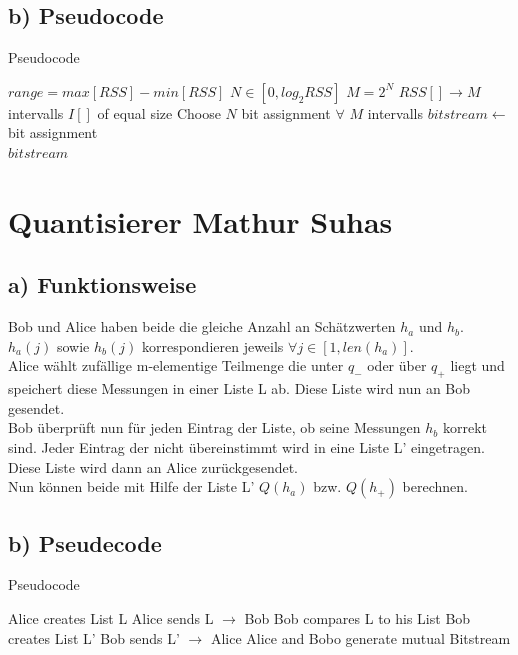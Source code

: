 \documentclass[12pt,a4paper]{article}
\begin{document}
\subsection*{b) Pseudocode}
\begin{algorithm}
\caption{Pseudocode}
\begin{algorithmic}[1]
\State $range = max[RSS] - min[RSS]$
\State $N \in [0, log_2 RSS]$
\State $M = 2^N$
\State $RSS[] \to M$ intervalls $I[]$ of equal size
\State Choose $N$ bit assignment $\forall$ $M$ intervalls
\State $bitstream \gets$ bit assignment
\EndIf
\EndFor
\EndFor\\
\Return $bitstream$
\end{algorithmic}
\end{algorithm}

\newpage
\section{Quantisierer Mathur Suhas}
\subsection*{a) Funktionsweise}
Bob und Alice haben beide die gleiche Anzahl an Schätzwerten $h_a$ und $h_b$.\\
$h_a(j)$ sowie $h_b(j)$ korrespondieren jeweils $\forall j \in [1,len(h_a)]$.\\
Alice wählt zufällige m-elementige Teilmenge die unter $q_-$ oder über $q_+$ liegt und speichert diese Messungen in einer Liste L ab. Diese Liste wird nun an Bob gesendet.\\
Bob überprüft nun für jeden Eintrag der Liste, ob seine Messungen $h_b$ korrekt sind. Jeder Eintrag der nicht übereinstimmt wird in eine Liste L' eingetragen. Diese Liste wird dann an Alice zurückgesendet.\\
Nun können beide mit Hilfe der Liste L' $Q(h_a)$ bzw. $Q(h_+)$ berechnen.

\subsection*{b) Pseudecode}
\begin{algorithm}
\caption{Pseudocode}
\begin{algorithmic}[1]
\State Alice creates List L
\State Alice sends L $\to$ Bob
\State Bob compares L to his List
\State Bob creates List L'
\State Bob sends L' $\to$ Alice
\State Alice and Bobo generate mutual Bitstream
\end{algorithmic}
\end{algorithm}
\end{document}
